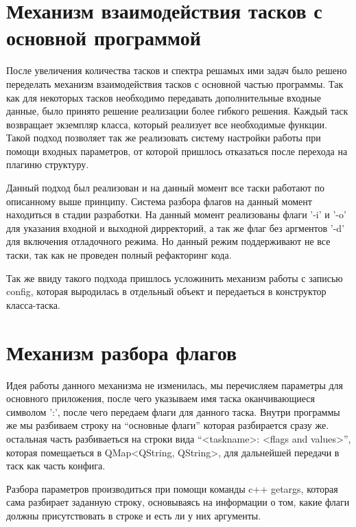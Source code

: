 
\section{Механизм взаимодействия тасков с основной программой}

После увеличения количества тасков и спектра решамых ими задач было решено переделать механизм взаимодействия тасков с основной частью программы. Так как для некоторых тасков необходимо передавать дополнительные входные данные, было принято решение реализации более гибкого решения. Каждый таск возвращает экземпляр класса, который реализует все необходимые функции. Такой подход позволяет так же реализовать систему настройки работы при помощи входных параметров, от которой пришлось отказаться после перехода на плагиню структуру.

Данный подход был реализован и на данный момент все таски работают по описанному выше принципу. Система разбора флагов на данный момент находиться в стадии разработки. На данный момент реализованы флаги '-i' и '-o' для указания входной и выходной дирректорий, а так же флаг без аргментов '-d' для включения отладочного режима. Но данный режим поддерживают не все таски, так как не проведен полный рефакторинг кода.

Так же ввиду такого подхода пришлось усложинить механизм работы с записью config, которая выродилась в отдельный объект и передаеться в конструктор класса-таска.

\section{Механизм разбора флагов}

Идея работы данного механизма не изменилась, мы перечисляем параметры для основного приложения, после чего указываем имя таска оканчивающиеся символом ':', после чего передаем флаги для данного таска. Внутри программы же мы разбиваем строку на ``основные флаги'' которая разбирается сразу же. остальная часть разбиваеться на строки вида ``<taskname>: <flags and values>'', которая помещаеться в QMap<QString, QString>, для дальнейшей передачи в таск как часть конфига.

Разбора параметров производиться при помощи команды c++ getargs, которая сама разбирает заданную строку, основываясь на информации о том, какие флаги должны присутствовать в строке и есть ли у них аргументы.


